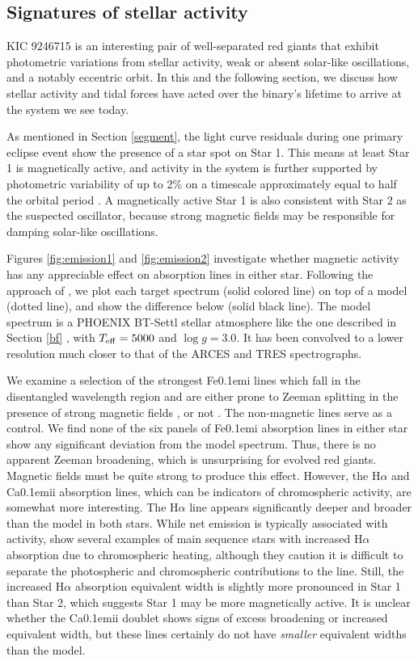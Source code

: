 \subsection{Signatures of stellar activity}\label{actrot}
KIC 9246715 is an interesting pair of well-separated red giants that exhibit photometric variations from stellar activity, weak or absent solar-like oscillations, and a notably eccentric orbit. In this and the following section, we discuss how stellar activity and tidal forces have acted over the binary's lifetime to arrive at the system we see today.

As mentioned in Section \ref{segment}, the light curve residuals during one primary eclipse event show the presence of a star spot on Star 1. This means at least Star 1 is magnetically active, and activity in the system is further supported by photometric variability of up to 2\% on a timescale approximately equal to half the orbital period \citep{gau14}. A magnetically active Star 1 is also consistent with Star 2 as the suspected oscillator, because strong magnetic fields may be responsible for damping solar-like oscillations.

Figures \ref{fig:emission1} and \ref{fig:emission2} investigate whether magnetic activity has any appreciable effect on absorption lines in either star. Following the approach of \citet{fro12}, we plot each target spectrum (solid colored line) on top of a model (dotted line), and show the difference below (solid black line). The model spectrum is a PHOENIX BT-Settl stellar atmosphere like the one described in Section \ref{bf} \citep{all03,asp09}, with $T_{\rm{eff}} = 5000$ and $\log g = 3.0$. It has been convolved to a lower resolution much closer to that of the ARCES and TRES spectrographs.

We examine a selection of the strongest {\rm Fe}\kern 0.1em{\sc i} lines which fall in the disentangled wavelength region and are either prone to Zeeman splitting in the presence of strong magnetic fields \citep{har73}, or not \citep{sis70}. The non-magnetic lines serve as a control. We find none of the six panels of {\rm Fe}\kern 0.1em{\sc i} absorption lines in either star show any significant deviation from the model spectrum. Thus, there is no apparent Zeeman broadening, which is unsurprising for evolved red giants. Magnetic fields must be quite strong to produce this effect. However, the H$\alpha$ and {\rm Ca}\kern 0.1em{\sc ii} absorption lines, which can be indicators of chromospheric activity, are somewhat more interesting. The H$\alpha$ line appears significantly deeper and broader than the model in both stars. While net emission is typically associated with activity, \citet{rob90} show several examples of main sequence stars with increased H$\alpha$ absorption due to chromospheric heating, although they caution it is difficult to separate the photospheric and chromospheric contributions to the line. Still, the increased H$\alpha$ absorption equivalent width is slightly more pronounced in Star 1 than Star 2, which suggests Star 1 may be more magnetically active. It is unclear whether the {\rm Ca}\kern 0.1em{\sc ii} doublet shows signs of excess broadening or increased equivalent width, but these lines certainly do not have \emph{smaller} equivalent widths than the model.

